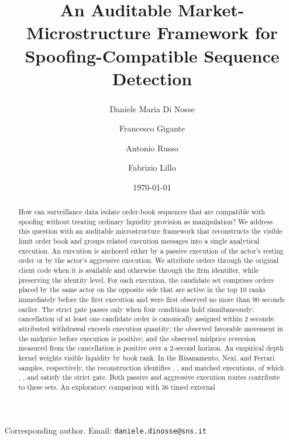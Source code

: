 \documentclass[11pt]{article}
\title{An Auditable Market-Microstructure Framework for Spoofing-Compatible Sequence Detection}
\author[1]{Daniele Maria Di Nosse\textsuperscript{\dag}}
\author[2]{Francesco Gigante}
\author[2]{Antonio Russo}
\author[1]{Fabrizio Lillo}
\affil[1]{Scuola Normale Superiore, Pisa, Italy}
\affil[2]{Consob, Rome, Italy}
\date{\today}
\newenvironment{review}{\begingroup\color{blue}}{\endgroup}
\begin{document}
\maketitle
\begin{center}
  \footnotesize
  \dag Corresponding author. Email: \texttt{daniele.dinosse@sns.it}
\end{center}

\begin{abstract}
How can surveillance data isolate order-book sequences that are compatible with spoofing without treating ordinary
liquidity provision as manipulation? We address this question with an auditable microstructure framework that reconstructs
the visible limit order book and groups related execution messages into a single analytical execution. An execution is anchored either by \begin{review}a passive execution of the actor's resting order\end{review} or by the actor's aggressive execution. We attribute orders through the original
client code when it is available and otherwise through the firm identifier, while preserving the identity level. For each
execution, the candidate set comprises \begin{review}orders placed by the same actor on the opposite side\end{review} that are active in the top $10$ ranks immediately
before the first execution and were first observed no more than $90$ seconds earlier. The strict gate passes only when four
conditions hold simultaneously: cancellation of at least one candidate order is canonically assigned within $2$ seconds; attributed
withdrawal exceeds execution quantity; \begin{review}the observed favorable movement in the midprice before execution\end{review} is positive; and
\begin{review}the observed midprice reversion measured from the cancellation\end{review} is positive over a $2$-second horizon. An empirical depth kernel weights visible
liquidity by book rank. In the Risanamento, Nexi, and Ferrari samples, respectively, the reconstruction identifies
\RisanamentoMatchedClusters{}, \NexiMatchedClusters{}, and \FerrariMatchedClusters{} matched executions, of which
\RisanamentoCompatibleSequences{}, \NexiCompatibleSequences{}, and \FerrariCompatibleSequences{} satisfy the strict gate.
Both passive and aggressive execution routes contribute to these sets. An exploratory comparison with $36$ timed external

\end{abstract}
\end{document}
